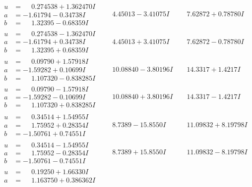 \documentclass[1p]{elsarticle_modified}
\theoremstyle{definition}
\begin{document}
$$\begin{array}{c|c|c}
\begin{aligned}
u &= \phantom{-}0.274538 + 1.362470 I \\
a &= -1.61794 - 0.34738 I \\
b &= \phantom{-}1.32395 - 0.68359 I\end{aligned}
 & \phantom{-}4.45013 - 3.41075 I & \phantom{-}7.62872 + 0.78780 I \\ \hline\begin{aligned}
u &= \phantom{-}0.274538 - 1.362470 I \\
a &= -1.61794 + 0.34738 I \\
b &= \phantom{-}1.32395 + 0.68359 I\end{aligned}
 & \phantom{-}4.45013 + 3.41075 I & \phantom{-}7.62872 - 0.78780 I \\ \hline\begin{aligned}
u &= \phantom{-}0.09790 + 1.57918 I \\
a &= -1.59282 + 0.10699 I \\
b &= \phantom{-}1.107320 - 0.838285 I\end{aligned}
 & \phantom{-}10.08840 - 3.80196 I & \phantom{-}14.3317 + 1.4217 I \\ \hline\begin{aligned}
u &= \phantom{-}0.09790 - 1.57918 I \\
a &= -1.59282 - 0.10699 I \\
b &= \phantom{-}1.107320 + 0.838285 I\end{aligned}
 & \phantom{-}10.08840 + 3.80196 I & \phantom{-}14.3317 - 1.4217 I \\ \hline\begin{aligned}
u &= \phantom{-}0.34514 + 1.54955 I \\
a &= \phantom{-}1.75952 + 0.28354 I \\
b &= -1.50761 + 0.74551 I\end{aligned}
 & \phantom{-}8.7389 - 15.8550 I & \phantom{-}11.09832 + 8.19798 I \\ \hline\begin{aligned}
u &= \phantom{-}0.34514 - 1.54955 I \\
a &= \phantom{-}1.75952 - 0.28354 I \\
b &= -1.50761 - 0.74551 I\end{aligned}
 & \phantom{-}8.7389 + 15.8550 I & \phantom{-}11.09832 - 8.19798 I \\ \hline\begin{aligned}
u &= \phantom{-}0.19250 + 1.66330 I \\
a &= \phantom{-}1.163750 + 0.386362 I \\

\end{aligned}
\end{array}$$
\end{document}
